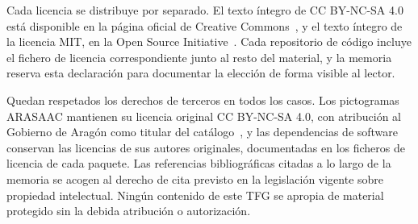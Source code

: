 Cada licencia se distribuye por separado. El texto íntegro de CC BY-NC-SA 4.0 está disponible en la página oficial de Creative Commons~\cite{ccbyncsa4}, y el texto íntegro de la licencia MIT, en la Open Source Initiative~\cite{mitlicense}. Cada repositorio de código incluye el fichero de licencia correspondiente junto al resto del material, y la memoria reserva esta declaración para documentar la elección de forma visible al lector.

Quedan respetados los derechos de terceros en todos los casos. Los pictogramas ARASAAC mantienen su licencia original CC BY-NC-SA 4.0, con atribución al Gobierno de Aragón como titular del catálogo~\cite{arasaac}, y las dependencias de software conservan las licencias de sus autores originales, documentadas en los ficheros de licencia de cada paquete. Las referencias bibliográficas citadas a lo largo de la memoria se acogen al derecho de cita previsto en la legislación vigente sobre propiedad intelectual. Ningún contenido de este TFG se apropia de material protegido sin la debida atribución o autorización.
